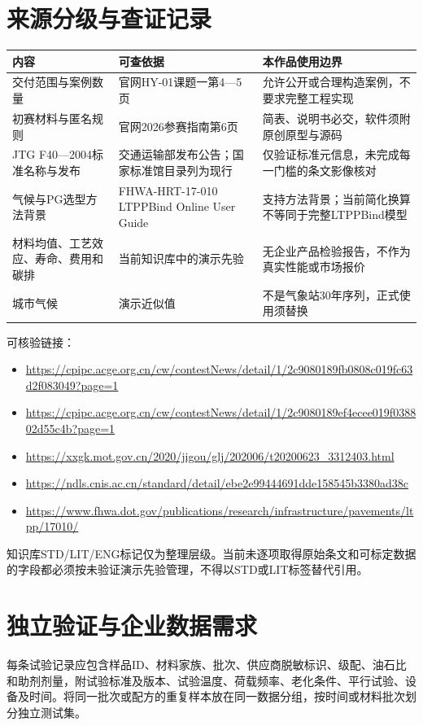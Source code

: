 \documentclass[UTF8,fontset=none,zihao=-4,a4paper]{ctexart}
\begin{document}
\section*{来源分级与查证记录}
\begingroup\small\setlength{\parindent}{0pt}\linespread{1.15}
\begin{longtable}{>{\raggedright\arraybackslash}p{0.220\dimexpr\textwidth-6\tabcolsep\relax}>{\raggedright\arraybackslash}p{0.380\dimexpr\textwidth-6\tabcolsep\relax}>{\raggedright\arraybackslash}p{0.400\dimexpr\textwidth-6\tabcolsep\relax}}
\toprule
\textbf{内容} & \textbf{可查依据} & \textbf{本作品使用边界} \\
\midrule
\endhead
交付范围与案例数量 & 官网HY-01课题一第4—5页 & 允许公开或合理构造案例，不要求完整工程实现 \\
初赛材料与匿名规则 & 官网2026参赛指南第6页 & 简表、说明书必交，软件须附原创原型与源码 \\
JTG F40—2004标准名称与发布 & 交通运输部发布公告；国家标准馆目录列为现行 & 仅验证标准元信息，未完成每一门槛的条文影像核对 \\
气候与PG选型方法背景 & FHWA-HRT-17-010 LTPPBind Online User Guide & 支持方法背景；当前简化换算不等同于完整LTPPBind模型 \\
材料均值、工艺效应、寿命、费用和碳排 & 当前知识库中的演示先验 & 无企业产品检验报告，不作为真实性能或市场报价 \\
城市气候 & 演示近似值 & 不是气象站30年序列，正式使用须替换 \\
\bottomrule
\end{longtable}
\endgroup
可核验链接：

\begin{itemize}
\item \url{https://cpipc.acge.org.cn/cw/contestNews/detail/1/2c9080189fb0808c019fc63d2f083049?page=1}
\item \url{https://cpipc.acge.org.cn/cw/contestNews/detail/1/2c9080189ef4ecee019f038802d55c4b?page=1}
\item \url{https://xxgk.mot.gov.cn/2020/jigou/glj/202006/t20200623_3312403.html}
\item \url{https://ndls.cnis.ac.cn/standard/detail/ebe2e99444691dde158545b3380ad38c}
\item \url{https://www.fhwa.dot.gov/publications/research/infrastructure/pavements/ltpp/17010/}
\end{itemize}
知识库STD/LIT/ENG标记仅为整理层级。当前未逐项取得原始条文和可标定数据的字段都必须按未验证演示先验管理，不得以STD或LIT标签替代引用。

\section*{独立验证与企业数据需求}
每条试验记录应包含样品ID、材料家族、批次、供应商脱敏标识、级配、油石比和助剂剂量，附试验标准及版本、试验温度、荷载频率、老化条件、平行试验、设备及时间。将同一批次或配方的重复样本放在同一数据分组，按时间或材料批次划分独立测试集。
\end{document}
